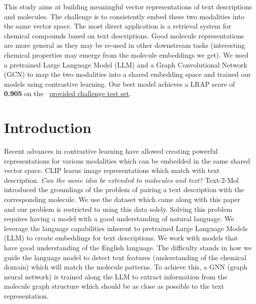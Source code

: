 This study aims at building meaningful vector representations of text descriptions and molecules. The challenge is to consistently embed these two modalities into the same vector space. The most direct application is a retrieval system for chemical compounds based on text descriptions. Good molecule representations are more general as they may be re-used in other downstream tasks (interesting chemical properties may emerge from the molecule embeddings we get). We used a pretrained Large Language Model (LLM) and a Graph Convolutional Network (GCN) to map the two modalities into a shared embedding space and trained our models using contrastive learning. Our best model achieves a LRAP score of \textbf{0.905} on the  ~\href{https://www.kaggle.com/competitions/altegrad-2023-data-challenge/leaderboard}{provided challenge test set}.

\section{Introduction}
\label{sec:intro}
Recent advances in contrastive learning have allowed creating powerful representations for various modalities which can be embedded in the same shared vector space. CLIP \cite{CLIP} learns image representations which match with text description. \textit{Can the same idea be extended to molecules and text?}
Text-2-Mol \cite{text2mol} introduced the groundings of the problem of pairing a text description with the corresponding molecule.
We use the dataset which came along with this paper and our problem is restricted to using this data solely. Solving this problem requires having a model with a good understanding of natural language. We leverage the language capabilities inherent to pretrained Large Language Models (LLM) to create embeddings for text descriptions. We work with models that have good understanding of the English language. The difficulty stands in how we guide the language model to detect text features (understanding of the chemical domain) which will match the molecule patterns. To achieve this, a GNN (graph neural network) is trained along the LLM to extract information from the molecule graph structure which should be as close as possible to the text representation.